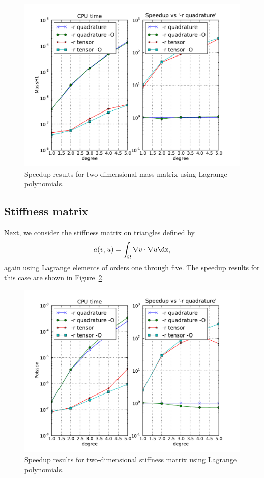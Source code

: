 \begin{figure}
  \begin{center}
    \includegraphics[width=12cm]{chapters/kirby-3/pdf/MassH1.pdf}
    \caption{Speedup results for two-dimensional mass matrix using Lagrange polynomials.}
    \label{fig:MassH1}
  \end{center}
\end{figure}

\subsection{Stiffness matrix}

Next, we consider the stiffness matrix on triangles defined by
\begin{equation}
a(v, u) = \int_{\Omega} \nabla v \cdot \nabla u \dx,
\end{equation}
again using Lagrange elements of orders one through five. The speedup
results for this case are shown in Figure~\ref{fig:Poisson}.

\begin{figure}
  \begin{center}
    \includegraphics[width=12cm]{chapters/kirby-3/pdf/Poisson.pdf}
    \caption{Speedup results for two-dimensional stiffness matrix using Lagrange polynomials.}
    \label{fig:Poisson}
  \end{center}
\end{figure}

